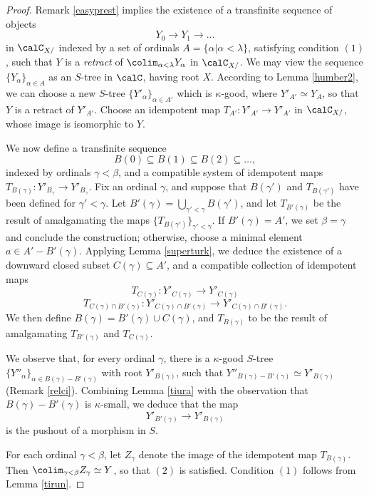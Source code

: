 \begin{proof}
Remark \ref{easyprest} implies the existence of a transfinite sequence of objects
$$ Y_0 \rightarrow Y_1 \rightarrow \ldots $$
in $\calC_{X/}$ indexed by a set of ordinals $A = \{ \alpha | \alpha < \lambda \}$, 
satisfying condition $(1)$, such that
$Y$ is a {\em retract} of $\colim_{\alpha < \lambda} Y_{\alpha}$ in $\calC_{X/}$. We may view
the sequence $\{ Y_{\alpha} \}_{ \alpha \in A}$ as an $S$-tree in $\calC$, having root $X$. According to Lemma \ref{humber2}, we can choose a new $S$-tree $\{ Y'_{\alpha} \}_{ \alpha \in A'}$
which is $\kappa$-good, where $Y'_{A'} \simeq Y_A$, so that $Y$ is a retract of
$Y'_{A'}$. Choose an idempotent map $T_{A'}: Y'_{A'} \rightarrow Y'_{A'}$ in $\calC_{X/}$, whose
image is isomorphic to $Y$.

We now define a transfinite sequence
$$ B(0) \subseteq B(1) \subseteq B(2) \subseteq \ldots, $$
indexed by ordinals $\gamma < \beta$, and a compatible system of idempotent maps $T_{B(\gamma)}: Y'_{B_\gamma} \rightarrow Y'_{B_{\gamma}}.$
Fix an ordinal $\gamma$, and suppose that $B(\gamma')$ and $T_{B(\gamma')}$ have been defined for $\gamma' < \gamma$. Let $B'(\gamma) = \bigcup_{ \gamma' < \gamma} B(\gamma')$, and let $T_{B'(\gamma)}$ be the result of amalgamating the maps $\{ T_{B(\gamma')} \}_{\gamma' < \gamma}$. If $B'(\gamma) = A'$, we set $\beta = \gamma$ and conclude the construction; otherwise, choose a minimal element $a \in A' - B'(\gamma)$. Applying Lemma \ref{superturk}, we deduce the existence of a downward closed subset $C(\gamma) \subseteq A'$, and a compatible collection of idempotent maps 
$$ T_{C(\gamma)} : Y'_{C(\gamma)} \rightarrow Y'_{C(\gamma)} $$
$$ T_{C(\gamma) \cap B'(\gamma)}: Y'_{C(\gamma) \cap B'(\gamma)} \rightarrow Y'_{C(\gamma) \cap B'(\gamma)}.$$
We then define $B(\gamma) = B'(\gamma) \cup C(\gamma)$, and
$T_{B(\gamma)}$ to be the result of amalgamating $T_{B'(\gamma)}$ and $T_{C(\gamma)}$. 

We observe that, for every ordinal $\gamma$, there is a $\kappa$-good $S$-tree 
$\{ Y''_{\alpha} \}_{ \alpha \in B(\gamma) - B'(\gamma)}$
with root $Y'_{B(\gamma)}$, such that $Y''_{B(\gamma)-B'(\gamma)} \simeq Y'_{B(\gamma)}$ (Remark \ref{relci}). Combining Lemma \ref{tiura} with the observation that 
$B(\gamma)-B'(\gamma)$ is $\kappa$-small, we deduce that the map
$$ Y'_{B'(\gamma)} \rightarrow Y'_{B(\gamma)}$$ is the pushout of a morphism in $S$.

For each ordinal $\gamma < \beta$, let $Z_{\gamma}$ denote the image of the idempotent map
$T_{B(\gamma)}$. Then $\colim_{\gamma < \beta} Z_{\gamma} \simeq Y$, so that $(2)$ is satisfied. Condition $(1)$ follows from Lemma \ref{tirun}.
\end{proof}

